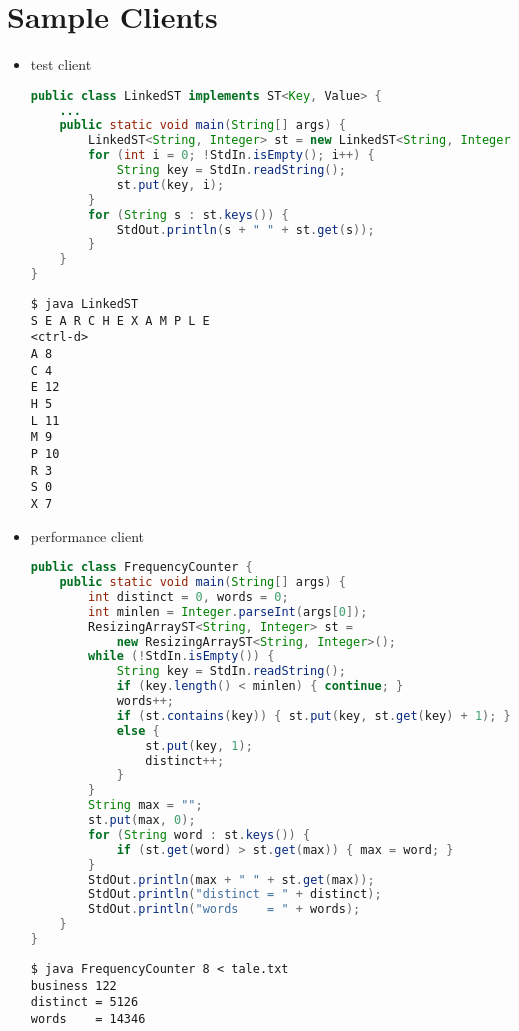 \documentclass[8pt,a4paper,compress]{beamer}
\begin{document}
\section{Sample Clients}
\begin{frame}[fragile]
\begin{itemize}
\item test client
\begin{lstlisting}[language=Java]
public class LinkedST implements ST<Key, Value> {
    ...
    public static void main(String[] args) {
        LinkedST<String, Integer> st = new LinkedST<String, Integer>();
        for (int i = 0; !StdIn.isEmpty(); i++) {
            String key = StdIn.readString();
            st.put(key, i);
        }
        for (String s : st.keys()) {
            StdOut.println(s + " " + st.get(s));
        }
    }
}
\end{lstlisting}

\begin{lstlisting}[language={}]
$ java LinkedST 
S E A R C H E X A M P L E
<ctrl-d>
A 8
C 4
E 12
H 5
L 11
M 9
P 10
R 3
S 0
X 7
\end{lstlisting}
\end{itemize}
\end{frame}

\begin{frame}[fragile]
\begin{itemize}
\item performance client
\begin{lstlisting}[language=Java]
public class FrequencyCounter {
    public static void main(String[] args) {
        int distinct = 0, words = 0;
        int minlen = Integer.parseInt(args[0]);
        ResizingArrayST<String, Integer> st = 
            new ResizingArrayST<String, Integer>();
        while (!StdIn.isEmpty()) {
            String key = StdIn.readString();
            if (key.length() < minlen) { continue; }
            words++;
            if (st.contains(key)) { st.put(key, st.get(key) + 1); }
            else {
                st.put(key, 1);
                distinct++;
            }
        }
        String max = "";
        st.put(max, 0);
        for (String word : st.keys()) {
            if (st.get(word) > st.get(max)) { max = word; }
        }
        StdOut.println(max + " " + st.get(max));
        StdOut.println("distinct = " + distinct);
        StdOut.println("words    = " + words);
    }
}
\end{lstlisting}

\begin{lstlisting}[language={}]
$ java FrequencyCounter 8 < tale.txt 
business 122
distinct = 5126
words    = 14346
\end{lstlisting}
\end{itemize}
\end{frame}
\end{document}
